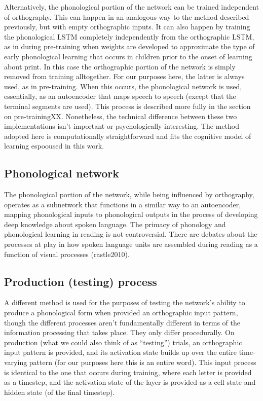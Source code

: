 \documentclass[
  american,
  man,floatsintext]{apa6}
\begin{document}
Alternatively, the phonological portion of the network can be trained independent of orthography. This can happen in an analogous way to the method described previously, but with empty orthographic inputs. It can also happen by training the phonological LSTM completely independently from the orthographic LSTM, as in during pre-training when weights are developed to approximate the type of early phonological learning that occurs in children prior to the onset of learning about print. In this case the orthographic portion of the network is simply removed from training alltogether. For our purposes here, the latter is always used, as in pre-training. When this occurs, the phonological network is used, essentially, as an autoencoder that maps speech to speech (except that the terminal segments are used). This process is described more fully in the section on pre-trainingXX. Nonetheless, the technical difference between these two implementations isn't important or psychologically interesting. The method adopted here is computationally straightforward and fits the cognitive model of learning espooused in this work.

\hypertarget{phonological-network}{%
\subsection{Phonological network}\label{phonological-network}}

The phonological portion of the network, while being influenced by orthography, operates as a subnetwork that functions in a similar way to an autoencoder, mapping phonological inputs to phonological outputs in the process of developing deep knowledge about spoken language. The primacy of phonology and phonological learning in reading is not controversial. There are debates about the processes at play in how spoken language units are assembled during reading as a function of visual processes (rastle2010).

\hypertarget{production-testing-process}{%
\subsection{Production (testing) process}\label{production-testing-process}}

A different method is used for the purposes of testing the network's ability to produce a phonological form when provided an orthographic input pattern, though the different processes aren't fundamentally different in terms of the information processing that takes place. They only differ procedurally. On production (what we could also think of as ``testing'') trials, an orthographic input pattern is provided, and its activation state builds up over the entire time-varying pattern (for our purposes here this is an entire word). This input process is identical to the one that occurs during training, where each letter is provided as a timestep, and the activation state of the layer is provided as a cell state and hidden state (of the final timestep).
\end{document}
